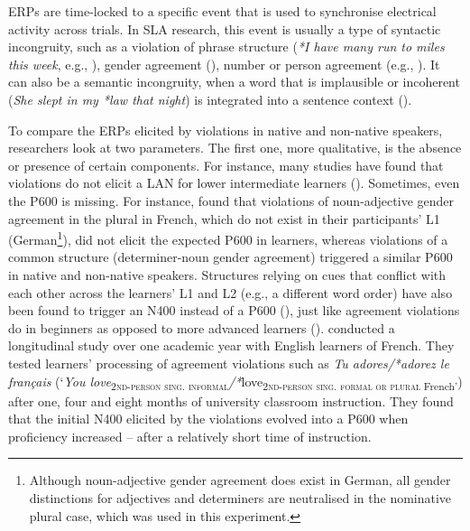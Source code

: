 \documentclass[output=paper,colorlinks,citecolor=brown,modfonts,nonflat]{../langscibook}
\begin{document}
ERPs are time-locked to a specific event that is used to synchronise electrical activity across trials. In SLA research, this event is usually a type of syntactic incongruity, such as a violation of phrase structure (\textit{*I have many run to miles this week}, e.g., \citealt{RossiEtAl2006,KotzEtAl2008,BowdenEtAl2013}), gender agreement (\citealt{Gillon-DowensEtAl2010,FoucartFrenck-Mestre2012}), number or person agreement (e.g., \citealt{RossiEtAl2006,TannerEtAl2009, TannerHell2014,Alemán-BañónEtAl2014, Alemán-BañónEtAl2017}). It can also be a semantic incongruity, when a word that is implausible or incoherent (\textit{She slept in my *law that night}) is integrated into a sentence context (\citealt{KutasHillyard1980,FriedericiEtAl1993,AstésanoEtAl2004,OjimaEtAl2005,WeissEtAl2005,DeLongEtAl2014,FoucartEtAl2014,SchneiderEtAl2016}).

To compare the ERPs elicited by violations in native and non-native speakers, researchers look at two parameters. The first one, more qualitative, is the absence or presence of certain components. For instance, many studies have found that violations do not elicit a LAN for lower intermediate learners (\citealt{OjimaEtAl2005,HahneEtAl2006,RossiEtAl2006,ChenEtAl2007}). Sometimes, even the P600 is missing. For instance, \citet{FoucartFrenck-Mestre2010} found that violations of noun-adjective gender agreement in the plural in French, which do not exist in their participants’ L1 (German\footnote{{Although noun-adjective gender agreement does exist in German, all gender distinctions for adjectives and determiners are neutralised in the nominative plural case, which was used in this experiment.}}), did not elicit the expected P600 in learners, whereas violations of a common structure (determiner-noun gender agreement) triggered a similar P600 in native and non-native speakers. Structures relying on cues that conflict with each other across the learners’ L1 and L2 (e.g., a different word order) have also been found to trigger an N400 instead of a P600 (\citealt{FoucartFrenck-Mestre2012}), just like agreement violations do in beginners as opposed to more advanced learners (\citealt{OsterhoutEtAl2006,McLaughlinEtAl2010}). \citet{OsterhoutEtAl2006} conducted a longitudinal study over one academic year with English learners of French. They tested learners’ processing of agreement violations such as \textit{Tu adores/*adorez le français} (‘\textit{You love}\textsubscript{\textsc{2nd-person sing. informal}}\textit{/*}love\textsubscript{\textsc{2nd-person sing. formal or plural} French’}) after one, four and eight months of university classroom instruction. They found that the initial N400 elicited by the violations evolved into a P600 when proficiency increased – after a relatively short time of instruction.
\end{document}
